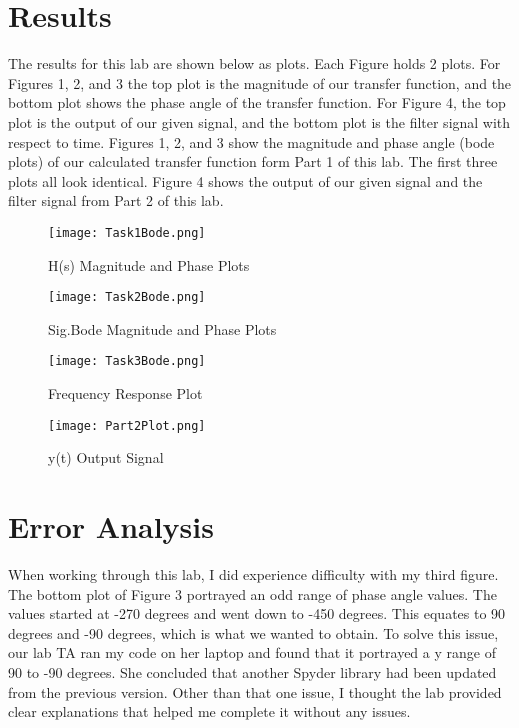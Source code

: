 \documentclass[12pt]{report}
\begin{document}
\section{Results}

The results for this lab are shown below as plots. Each Figure holds 2 plots. For Figures 1, 2, and 3 the top plot is the magnitude of our transfer function, and the bottom plot shows the phase angle of the transfer function. For Figure 4, the top plot is the output of our given signal, and the bottom plot is the filter signal with respect to time. Figures 1, 2, and 3 show the magnitude and phase angle (bode plots) of our calculated transfer function form Part 1 of this lab. The first three plots all look identical. Figure 4 shows the output of our given signal and the filter signal from Part 2 of this lab.


\begin{figure}
\texttt{[image: Task1Bode.png]}
\caption{H(s) Magnitude and Phase Plots}
\end{figure}

\begin{figure}
\texttt{[image: Task2Bode.png]}
\caption{Sig.Bode Magnitude and Phase Plots}
\end{figure}

\begin{figure}
\texttt{[image: Task3Bode.png]}
\caption{Frequency Response Plot}
\end{figure}

\begin{figure}
\texttt{[image: Part2Plot.png]}
\caption{y(t) Output Signal}
\end{figure}

\newpage

\section{Error Analysis}

When working through this lab, I did experience difficulty with my third figure. The bottom plot of Figure 3 portrayed an odd range of phase angle values. The values started at -270 degrees and went down to -450 degrees. This equates to 90 degrees and -90 degrees, which is what we wanted to obtain. To solve this issue, our lab TA ran my code on her laptop and found that it portrayed a y range of 90 to -90 degrees. She concluded that another Spyder library had been updated from the previous version. Other than that one issue, I thought the lab provided clear explanations that helped me complete it without any issues. 
\end{document}

